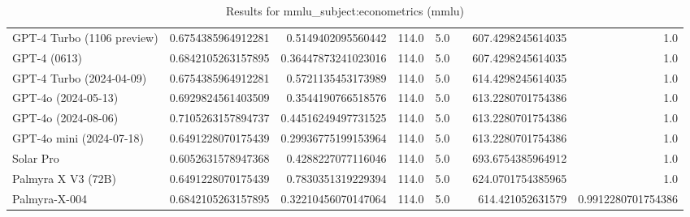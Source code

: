 \begin{table}[htp]
{\begin{tabular}{lrrrrrrr}
GPT-4 Turbo (1106 preview) & 0.6754385964912281 & 0.5149402095560442 & 114.0 & 5.0 &  & 607.4298245614035 & 1.0 \\
GPT-4 (0613) & 0.6842105263157895 & 0.36447873241023016 & 114.0 & 5.0 &  & 607.4298245614035 & 1.0 \\
GPT-4 Turbo (2024-04-09) & 0.6754385964912281 & 0.5721135453173989 & 114.0 & 5.0 &  & 614.4298245614035 & 1.0 \\
GPT-4o (2024-05-13) & 0.6929824561403509 & 0.3544190766518576 & 114.0 & 5.0 &  & 613.2280701754386 & 1.0 \\
GPT-4o (2024-08-06) & 0.7105263157894737 & 0.44516249497731525 & 114.0 & 5.0 &  & 613.2280701754386 & 1.0 \\
GPT-4o mini (2024-07-18) & 0.6491228070175439 & 0.29936775199153964 & 114.0 & 5.0 &  & 613.2280701754386 & 1.0 \\
Solar Pro & 0.6052631578947368 & 0.4288227077116046 & 114.0 & 5.0 &  & 693.6754385964912 & 1.0 \\
Palmyra X V3 (72B) & 0.6491228070175439 & 0.7830351319229394 & 114.0 & 5.0 &  & 624.0701754385965 & 1.0 \\
Palmyra-X-004 & 0.6842105263157895 & 0.32210456070147064 & 114.0 & 5.0 &  & 614.421052631579 & 0.9912280701754386 \\
\bottomrule
\end{tabular}}
\caption{Results for mmlu_subject:econometrics (mmlu)}
\label{fig:mmlu_subject:econometrics (mmlu)}
\end{table}